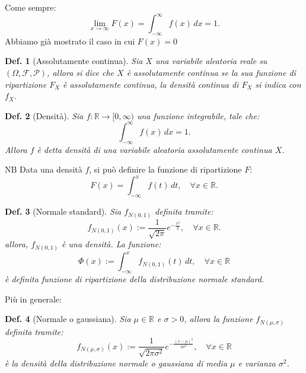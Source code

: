 \documentclass{article}
\newtheorem{definition}{Def.}[section]
\begin{document}
Come sempre:
\begin{equation*}
	\lim_{x \to \infty}F(x) = \int_{-\infty}^{\infty} f(x) \, dx = 1.
\end{equation*}
Abbiamo già mostrato il caso in cui $F(x) = 0$

\begin{definition}[Assolutamente continua]
	Sia $X$ una variabile aleatoria reale su $(\Omega, \mathcal{F, P})$, allora
	si dice che $X$ è assolutamente continua se la sua funzione di ripartizione
	$F_X$ è assolutamente continua, la densità continua di $F_X$ si indica con
	$f_X$.
\end{definition}

\begin{definition}[Densità]
	Sia $f: \mathbb{R} \to [0, \infty)$ una funzione integrabile, tale che:
	\begin{equation*}
		\int_{-\infty}^{\infty} f(x) \, dx = 1.
	\end{equation*}
	Allora $f$ è detta densità di una variabile aleatoria assolutamente continua
	$X$.
\end{definition}
NB Data una densità $f$, si può definire la funzione di ripartizione $F$:
\begin{equation*}
	F(x) = \int_{-\infty}^x f(t) \, dt, \quad \forall x \in \mathbb{R}.
\end{equation*}

\begin{definition}[Normale standard]
	Sia $f_{N(0, 1)}$ definita tramite:
	\begin{equation}
		f_{N(0, 1)}(x) := \frac{1}{\sqrt{2 \pi}} e^{-\frac{x^2}{2}}, \quad \forall x
		\in \mathbb{R}.
	\end{equation}
	allora, $f_{N(0, 1)}$ è una densità. La funzione:
	\begin{equation*}
		\Phi(x) := \int_{-\infty}^x f_{N(0, 1)}(t) \, dt, \quad \forall x \in
		\mathbb{R}
	\end{equation*}
	è definita funzione di ripartizione della distribuzione normale standard.
\end{definition}

Più in generale:
\begin{definition}[Normale o gaussiana]
	Sia $\mu \in \mathbb{R}$ e $\sigma > 0$, allora la funzione $f_{N(\mu, \sigma)}$
	definita tramite:
	\begin{equation*}
		f_{N(\mu, \sigma)}(x) := \frac{1}{\sqrt{2 \pi \sigma^2}} e^{-\frac{(x -
		\mu)^2}{2 \sigma^2}}, \quad \forall x \in \mathbb{R}
	\end{equation*}
	è la densità della distribuzione normale o gaussiana di media $\mu$ e
	varianza $\sigma^2$.
\end{definition}
\end{document}
